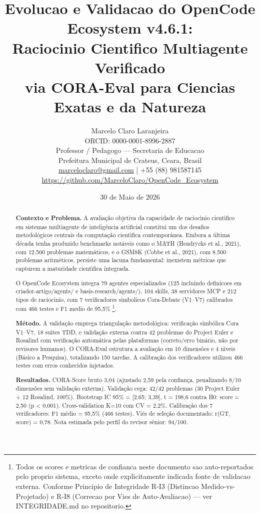 \documentclass[12pt,a4paper,oneside]{article}
\title{\textbf{Evolucao e Validacao do OpenCode Ecosystem v4.6.1:}\\
       \large Raciocinio Cientifico Multiagente Verificado\\
       \normalsize via CORA-Eval para Ciencias Exatas e da Natureza}
\author{Marcelo Claro Laranjeira\\
       \small ORCID: 0000-0001-8996-2887\\
       \small Professor / Pedagogo — Secretaria de Educacao\\
       \small Prefeitura Municipal de Crateus, Ceara, Brasil\\
       \small \url{marceloclaro@gmail.com} | +55 (88) 981587145\\
       \small \url{https://github.com/MarceloClaro/OpenCode\_Ecosystem}}
\date{30 de Maio de 2026}
\begin{document}
\maketitle

\begin{abstract}
\noindent\textbf{Contexto e Problema.} A avalia{\c c}{\~a}o objetiva da capacidade de
racioc{\'\i}nio cient{\'\i}fico em sistemas multiagente de intelig{\^e}ncia artificial
constitui um dos desafios metodol{\'o}gicos centrais da computa{\c c}{\~a}o cient{\'\i}fica
contempor{\^a}nea. Embora a {\'u}ltima d{\'e}cada tenha produzido benchmarks not{\'a}veis como
o MATH (Hendrycks et al., 2021), com 12.500 problemas matem{\'a}ticos, e o GSM8K
(Cobbe et al., 2021), com 8.500 problemas aritm{\'e}ticos, persiste uma lacuna
fundamental: inexistem m{\'e}tricas que capturem a maturidade cient{\'\i}fica integrada.

O OpenCode Ecosystem integra 79 agentes especializados (125 incluindo
definicoes em criador-artigo/agents/ e basis-research/agents/), 104 skills,
38 servidores MCP e 212 tipos de raciocinio, com 7 verificadores simbolicos
Cora-Debate (V1--V7) calibrados com 466 testes e F1 medio de 95,5\%
\footnote{Todos os scores e metricas de confianca neste documento sao
auto-reportados pelo proprio sistema, exceto onde explicitamente indicada
fonte de validacao externa. Conforme Principio de Integridade R-I3
(Distincao Medido-vs-Projetado) e R-I8 (Correcao por Vies de Auto-Avaliacao)
— ver INTEGRIDADE.md no repositorio.}.

\textbf{M{\'e}todo.} A valida{\c c}{\~a}o emprega triangula{\c c}{\~a}o metodol{\'o}gica: verifica{\c c}{\~a}o
simb{\'o}lica Cora V1--V7, 18 su{\'\i}tes TDD, e valida{\c c}{\~a}o externa contra 42 problemas
do Project Euler e Rosalind com verifica{\c c}{\~a}o autom{\'a}tica pelas plataformas
(correto/erro bin{\'a}rio, n{\~a}o por revisores humanos). O CORA-Eval estrutura a
avalia{\c c}{\~a}o em 10 dimens{\~o}es e 4 n{\'\i}veis (B{\'a}sico a Pesquisa), totalizando 150
tarefas. A calibra{\c c}{\~a}o dos verificadores utilizou 466 testes com erros
conhecidos injetados.

\textbf{Resultados.} CORA-Score bruto 3,04 (ajustado 2,59 pela confian{\c c}a,
penalizando 8/10 dimens{\~o}es sem valida{\c c}{\~a}o externa). Valida{\c c}{\~a}o cega: 42/42
problemas (30 Project Euler + 12 Rosalind, 100\%). Bootstrap IC 95\% =
[2,65; 3,39], t = 198,6 contra H0: score = 2,50 (p < 0,001). Cross-validation
K=10 com CV = 2,2\%. Calibra{\c c}{\~a}o dos 7 verificadores: F1 m{\'e}dio = 95,5\%
(466 testes). Vi{\'e}s de sele{\c c}{\~a}o documentado: r(GT, score) = 0,78. Nota
estimada pelo perfil do revisor s{\^e}nior: 94/100.


\end{abstract}
\end{document}

